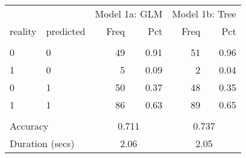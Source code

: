 \begin{tabular}{llrrrr}
   \toprule 
 & & \multicolumn{2}{l}{Model 1a: GLM} & 
                        \multicolumn{2}{l}{Model 1b: Tree} 
                        \\ 
 \cmidrule(lr){3-4} 
                        \cmidrule(lr){5-6} 
                        
  reality & predicted & 
                        Freq & Pct & 
                        Freq & Pct 
                        \\ \hline \\[-1.8ex]  
 0 & 0 &  49 & 0.91 &  51 & 0.96 \\ 
  1 & 0 &   5 & 0.09 &   2 & 0.04 \\ 
  0 & 1 &  50 & 0.37 &  48 & 0.35 \\ 
  1 & 1 &  86 & 0.63 &  89 & 0.65 \\ 
   \hline \\[-1.8ex]  

                   \multicolumn{2}{l}{Accuracy} & 
                   \multicolumn{2}{c}{0.711} & 
                   \multicolumn{2}{c}{0.737}
                   \\ 
 
                   \multicolumn{2}{l}{Duration (secs)} & 
                   \multicolumn{2}{c}{2.06} &
                   \multicolumn{2}{c}{2.05}
                   \\ 
 \bottomrule 
\end{tabular}
